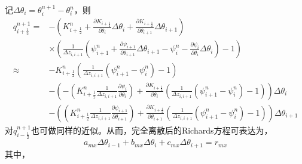 记$\Delta \theta_i=\theta_i^{n+1}-\theta_i^n$，则
\begin{equation}
\begin{split} 
q_{i+\frac{1}{2}}^{n+1} =&-\left(K_{i+\frac{1}{2}}^{n}+\frac{\partial K_{i+\frac{1}{2}}}{\partial \theta_{i}} \Delta \theta_{i} + \frac{\partial K_{i+\frac{1}{2}}}{\partial \theta_{i+1}} \Delta \theta_{i+1}\right)  \\
    & \times \left(\frac{1}{\Delta z_{i, i+1}}\left(\psi_{i+1}^{n}+\frac{\partial \psi_{i+1}}{\partial \theta_{i+1}} \Delta \theta_{i+1}-\psi_{i}^{n}-\frac{\partial \psi_{i}}
    {\partial \theta_{i}} \Delta \theta_{i}\right)-1\right) \\ 
    \approx & -K_{i+\frac{1}{2}}^{n}\left(\frac{1}{\Delta z_{i, i+1}}\left(\psi_{i+1}^{n}-\psi_{i}^{n}\right)-1\right) \\
    &-\left(-\left(K_{i+\frac{1}{2}}^{n} \frac{1}{\Delta z_{i, i+1}} \frac{\partial \psi_{i}}{\partial \theta_{i}}\right)+\frac{\partial K_{i+\frac{1}{2}}}{\partial 
     \theta_{i}}\left(\frac{1}{\Delta z_{i, i+1}}\left(\psi_{i+1}^{n}-\psi_{i}^{n}\right)-1\right)\right) \Delta \theta_{i} \\ 
    &-\left(\left(K_{i+\frac{1}{2}}^{n} \frac{1}{\Delta z_{i, i+1}} \frac{\partial \psi_{i+1}}{\partial \theta_{i+1}}\right)+\frac{\partial K_{i+\frac{1}{2}}}{\partial
      \theta_{i+1}}\left(\frac{1}{\Delta z_{i, i+1}}\left(\psi_{i+1}^{n}-\psi_{i}^{n}\right)-1\right)\right) \Delta \theta_{i+1} 
\end{split}
\end{equation}
对$q_{i-\frac{1}{2}}^{n+1}$也可做同样的近似。从而，完全离散后的Richards方程可表达为，
\begin{equation}
{a}_{{mx}} \Delta \theta_{i-1}+b_{m x} \Delta \theta_{i}+c_{m x} \Delta \theta_{i+1}=r_{m x}
\end{equation}
其中，
